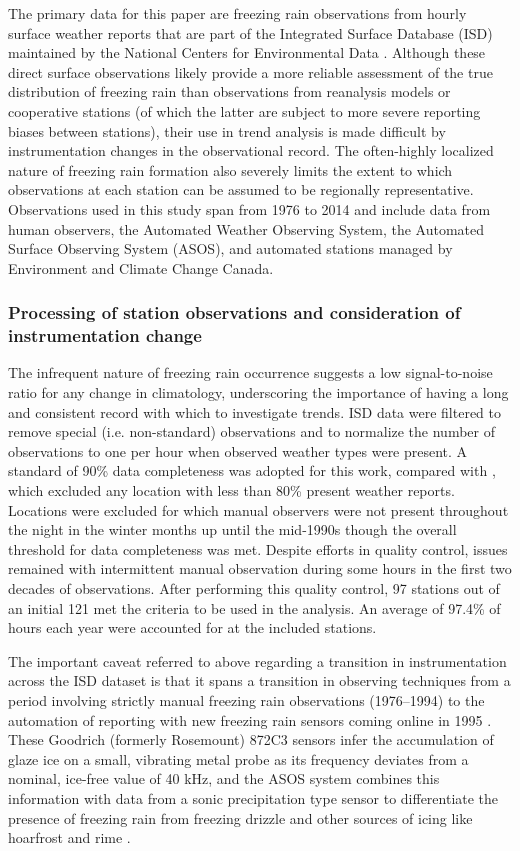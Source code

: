 \documentclass[twocol]{ametsoc}
\begin{document}
The primary data for this paper are freezing rain observations from hourly surface weather reports that are part of the Integrated Surface Database (ISD) maintained by the National Centers for Environmental Data \citep{smith2011integrated}. Although these direct surface observations likely provide a more reliable assessment of the true distribution of freezing rain than observations from reanalysis models or cooperative stations (of which the latter are subject to more severe reporting biases between stations), their use in trend analysis is made difficult by instrumentation changes in the observational record. The often-highly localized nature of freezing rain formation also severely limits the extent to which observations at each station can be assumed to be regionally representative. Observations used in this study span from 1976 to 2014 and include data from human observers, the Automated Weather Observing System, the Automated Surface Observing System (ASOS), and automated stations managed by Environment and Climate Change Canada.

\subsubsection{Processing of station observations and consideration of instrumentation change}
The infrequent nature of freezing rain occurrence suggests a low signal-to-noise ratio for any change in climatology, underscoring the importance of having a long and consistent record with which to investigate trends. ISD data were filtered to remove special (i.e. non-standard) observations and to normalize the number of observations to one per hour when observed weather types were present. A standard of 90\% data completeness was adopted for this work, compared with \citet{cortinas2000climatology}, which excluded any location with less than 80\% present weather reports. Locations were excluded for which manual observers were not present throughout the night in the winter months up until the mid-1990s though the overall threshold for data completeness was met. Despite efforts in quality control, issues remained with intermittent manual observation during some hours in the first two decades of observations. After performing this quality control, 97 stations out of an initial 121 met the criteria to be used in the analysis. An average of 97.4\% of hours each year were accounted for at the included stations.

The important caveat referred to above regarding a transition in instrumentation across the ISD dataset is that it spans a transition in observing techniques from a period involving strictly manual freezing rain observations (1976--1994) to the automation of reporting with new freezing rain sensors coming online in 1995 \citep{ramsay1995status}. These Goodrich (formerly Rosemount) 872C3 sensors infer the accumulation of glaze ice on a small, vibrating metal probe as its frequency deviates from a nominal, ice-free value of 40 kHz, and the ASOS system combines this information with data from a sonic precipitation type sensor to differentiate the presence of freezing rain from freezing drizzle and other sources of icing like hoarfrost and rime \citep{asos1998}.
\end{document}

